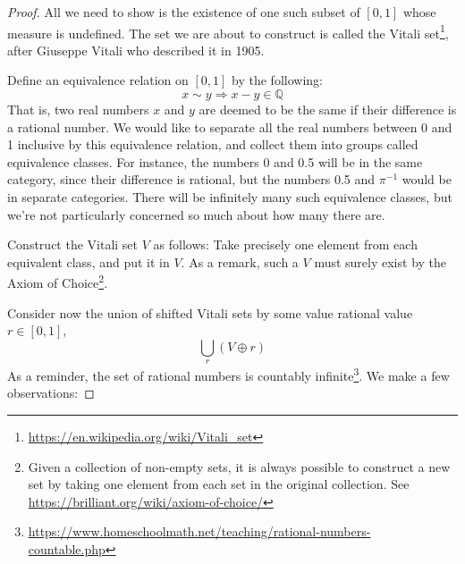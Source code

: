 \documentclass[
]{book}
\newcommand{\bbQ}{\mathbb{Q}}
\theoremstyle{definition}
\theoremstyle{definition}
\theoremstyle{definition}
\theoremstyle{definition}
\theoremstyle{remark}
\begin{document}
\begin{proof}
All we need to show is the existence of one such subset of \([0,1]\) whose measure is undefined. The set we are about to construct is called the Vitali set\footnote{\url{https://en.wikipedia.org/wiki/Vitali_set}}, after Giuseppe Vitali who described it in 1905.

Define an equivalence relation on \([0,1]\) by the following:
\[x\sim y \Rightarrow x-y \in \bbQ\]
That is, two real numbers \(x\) and \(y\) are deemed to be the same if their difference is a rational number. We would like to separate all the real numbers between 0 and 1 inclusive by this equivalence relation, and collect them into groups called equivalence classes. For instance, the numbers 0 and 0.5 will be in the same category, since their difference is rational, but the numbers 0.5 and \(\pi^{-1}\) would be in separate categories. There will be infinitely many such equivalence classes, but we're not particularly concerned so much about how many there are.

Construct the Vitali set \(V\) as follows: Take precisely one element from each equivalent class, and put it in \(V\). As a remark, such a \(V\) must surely exist by the Axiom of Choice\footnote{Given a collection of non-empty sets, it is always possible to construct a new set by taking one element from each set in the original collection. See \url{https://brilliant.org/wiki/axiom-of-choice/}}.

Consider now the union of shifted Vitali sets by some value rational value \(r\in[0,1]\),
\[
\bigcup_{r} (V \oplus r)
\]
As a reminder, the set of rational numbers is countably infinite\footnote{\url{https://www.homeschoolmath.net/teaching/rational-numbers-countable.php}}. We make a few observations:


\end{proof}
\end{document}
